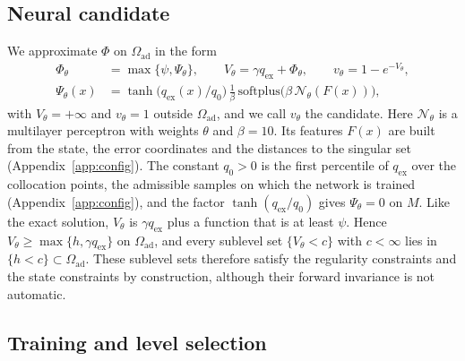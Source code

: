 \documentclass{l4dc2027}
\newcommand{\Oad}{\Omega_{\mathrm{ad}}}
\newcommand{\qex}{q_{\mathrm{ex}}}
\begin{document}
\subsection{Neural candidate}\label{sec:cand}
We approximate $\Phi$ on $\Oad$ in the form
\begin{equation}\label{eq:ansatz}
\begin{aligned}
\Phi_\theta&=\max\{\psi,\Psi_\theta\},\qquad V_\theta=\gamma\qex+\Phi_\theta,\qquad v_\theta=1-e^{-V_\theta},\\
\Psi_\theta(x)&=\tanh\!\big(\qex(x)/q_0\big)\,\tfrac1\beta\,\mathrm{softplus}\big(\beta\,\mathcal N_\theta(F(x))\big),
\end{aligned}
\end{equation}
with $V_\theta=+\infty$ and $v_\theta=1$ outside $\Oad$, and we call $v_\theta$ the candidate. Here $\mathcal N_\theta$ is a multilayer perceptron with weights $\theta$ and $\beta=10$. Its features $F(x)$ are built from the state, the error coordinates and the distances to the singular set (Appendix~\ref{app:config}). The constant $q_0>0$ is the first percentile of $\qex$ over the collocation points, the admissible samples on which the network is trained (Appendix~\ref{app:config}), and the factor $\tanh(\qex/q_0)$ gives $\Psi_\theta=0$ on $M$. Like the exact solution, $V_\theta$ is $\gamma\qex$ plus a function that is at least $\psi$. Hence $V_\theta\ge\max\{h,\gamma\qex\}$ on $\Oad$, and every sublevel set $\{V_\theta<c\}$ with $c<\infty$ lies in $\{h<c\}\subset\Oad$. These sublevel sets therefore satisfy the regularity constraints and the state constraints by construction, although their forward invariance is not automatic.

\vspace{-0.075in}

\subsection{Training and level selection}\label{sec:train}
\end{document}
